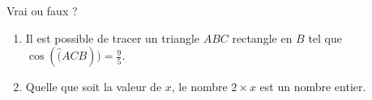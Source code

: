 
\begin{mental}
    Vrai ou faux ?
    \begin{enumerate}
        \item
            Il est possible de tracer un triangle \( ABC\) rectangle en \( B\) tel que \( \cos(\widehat(ACB))=\frac{ 9 }{ 5 }\).
        \item
            Quelle que soit la valeur de \( x\), le nombre \(   2\times x \) est un nombre entier.
    \end{enumerate}
\end{mental}
